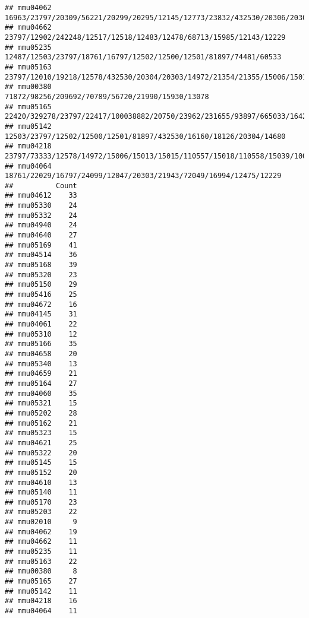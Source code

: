 \documentclass[
]{article}
\begin{document}
\begin{verbatim}
## mmu04062                                                                                                                                                    16963/23797/20309/56221/20299/20295/12145/12773/23832/432530/20306/20307/20304/20303/12775/12777/56838/12458/12766
## mmu04662                                                                                                                                                                                                    23797/12902/242248/12517/12518/12483/12478/68713/15985/12143/12229
## mmu05235                                                                                                                                                                                                     12487/12503/23797/18761/16797/12502/12500/12501/81897/74481/60533
## mmu05163                                                                                                                          23797/12010/19218/12578/432530/20304/20303/14972/21354/21355/15006/15013/15015/110557/15018/110558/15039/100529082/15024/630294/667977/14990
## mmu00380                                                                                                                                                                                                                      71872/98256/209692/70789/56720/21990/15930/13078
## mmu05165                                                                                      22420/329278/23797/22417/100038882/20750/23962/231655/93897/665033/16421/17857/17858/14972/15006/15013/15015/110557/15018/110558/15039/100529082/15024/630294/667977/14990/94216
## mmu05142                                                                                                                                                                                                    12503/23797/12502/12500/12501/81897/432530/16160/18126/20304/14680
## mmu04218                                                                                                                                                               23797/73333/12578/14972/15006/15013/15015/110557/15018/110558/15039/100529082/15024/630294/667977/14990
## mmu04064                                                                                                                                                                                                     18761/22029/16797/24099/12047/20303/21943/72049/16994/12475/12229
##          Count
## mmu04612    33
## mmu05330    24
## mmu05332    24
## mmu04940    24
## mmu04640    27
## mmu05169    41
## mmu04514    36
## mmu05168    39
## mmu05320    23
## mmu05150    29
## mmu05416    25
## mmu04672    16
## mmu04145    31
## mmu04061    22
## mmu05310    12
## mmu05166    35
## mmu04658    20
## mmu05340    13
## mmu04659    21
## mmu05164    27
## mmu04060    35
## mmu05321    15
## mmu05202    28
## mmu05162    21
## mmu05323    15
## mmu04621    25
## mmu05322    20
## mmu05145    15
## mmu05152    20
## mmu04610    13
## mmu05140    11
## mmu05170    23
## mmu05203    22
## mmu02010     9
## mmu04062    19
## mmu04662    11
## mmu05235    11
## mmu05163    22
## mmu00380     8
## mmu05165    27
## mmu05142    11
## mmu04218    16
## mmu04064    11
\end{verbatim}
\end{document}
